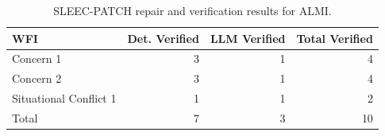 \begin{table}[t]
\caption{SLEEC-PATCH repair and verification results for ALMI.}
\label{tab:almi-repair-verification-summary}
\centering
\begin{tabular}{lrrr}
\toprule
WFI & Det. Verified & LLM Verified & Total Verified \\
\midrule
Concern 1 & 3 & 1 & 4 \\
Concern 2 & 3 & 1 & 4 \\
Situational Conflict 1 & 1 & 1 & 2 \\
\midrule
Total & 7 & 3 & 10 \\
\bottomrule
\end{tabular}
\end{table}
